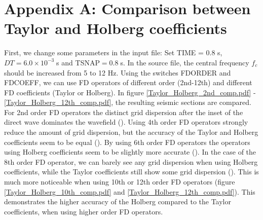 \documentclass[11pt,onecolumn,oneside]{article}
\begin{document}
\section{Appendix A: Comparison between Taylor and Holberg coefficients}
\label{comp_taylor_holberg}
First, we change some parameters in the input file: Set TIME = 0.8 s, $DT=6.0 \times 10^{-3}\;$s and TSNAP$=0.8\;$s. In the source file, the central frequency $f_c$ should be increased
from 5 to 12 Hz. Using the switches FDORDER and FDCOEFF,  we can use FD operators of different order (2nd-12th) and different FD coefficients (Taylor or Holberg). In figure 
\ref{Taylor_Holberg_2nd_comp.pdf} - \ref{Taylor_Holberg_12th_comp.pdf}, the resulting seismic sections are compared. For 2nd order FD operators the distinct grid dispersion after
the inset of the direct wave dominates the wavefield (). Using 4th order FD operators strongly reduce the amount of grid dispersion, but the
accuracy of the Taylor and Holberg coefficients seem to be equal (). By using 6th order FD operators the operators using Holberg coefficients seem
to be slightly more accurate (). In the case of the 8th order FD operator, we can barely see any grid dispersion when using Holberg coefficients,
while the Taylor coefficients still show some grid dispersion (). This is much more noticeable when using 10th or 12th order FD operators (figure
\ref{Taylor_Holberg_10th_comp.pdf} and \ref{Taylor_Holberg_12th_comp.pdf}). This demonstrates the higher accuracy of the Holberg compared to the Taylor coefficients, when using
higher order FD operators.      
\end{document}
